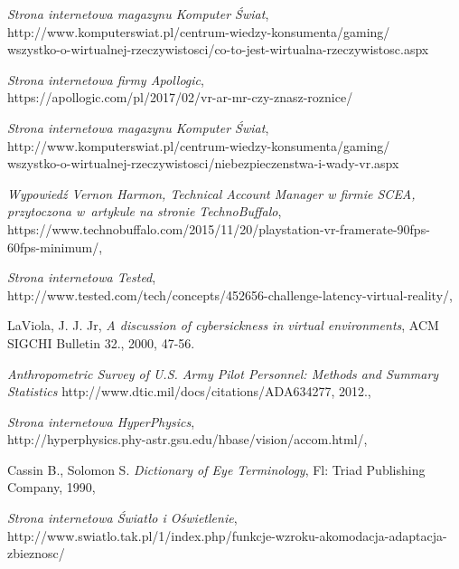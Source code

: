 \documentclass[a4paper,11pt,twoside]{report}
\theoremstyle{definition}
\begin{document}
\begin{thebibliography}{20}%

 \emph{Strona internetowa magazynu Komputer Świat},\\http://www.komputerswiat.pl/centrum-wiedzy-konsumenta/gaming/\\wszystko-o-wirtualnej-rzeczywistosci/co-to-jest-wirtualna-rzeczywistosc.aspx

 \emph{Strona internetowa firmy Apollogic},\\https://apollogic.com/pl/2017/02/vr-ar-mr-czy-znasz-roznice/

 \emph{Strona internetowa magazynu Komputer Świat},\\http://www.komputerswiat.pl/centrum-wiedzy-konsumenta/gaming/\\wszystko-o-wirtualnej-rzeczywistosci/niebezpieczenstwa-i-wady-vr.aspx

 \emph{Wypowiedź Vernon Harmon, Technical Account Manager w firmie SCEA, przytoczona w~artykule na stronie TechnoBuffalo},\\https://www.technobuffalo.com/2015/11/20/playstation-vr-framerate-90fps-60fps-minimum/,

 \emph{Strona internetowa Tested},\\http://www.tested.com/tech/concepts/452656-challenge-latency-virtual-reality/,

 LaViola, J. J. Jr, \emph{A discussion of cybersickness in virtual environments}, ACM SIGCHI Bulletin 32., 2000, 47-56.

 \emph{Anthropometric Survey of U.S. Army Pilot Personnel: Methods and Summary Statistics} http://www.dtic.mil/docs/citations/ADA634277, 2012.,

 \emph{Strona internetowa HyperPhysics},\\http://hyperphysics.phy-astr.gsu.edu/hbase/vision/accom.html/,

 Cassin B., Solomon S. \emph{Dictionary of Eye Terminology}, Fl: Triad Publishing Company, 1990,

 \emph{Strona internetowa Światło i Oświetlenie},\\http://www.swiatlo.tak.pl/1/index.php/funkcje-wzroku-akomodacja-adaptacja-zbieznosc/

\end{thebibliography}
\thispagestyle{empty}
\end{document}
